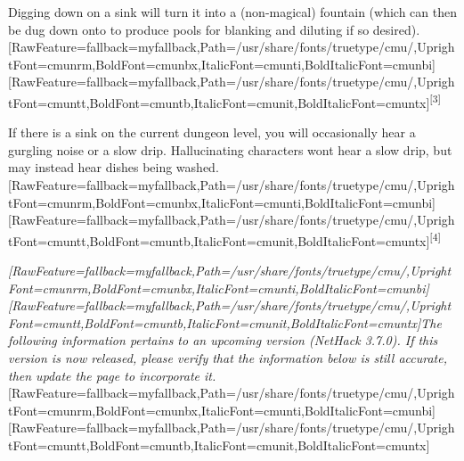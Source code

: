 \begin{myitemize}\item{}Digging\footnotemark[39] down on a sink will turn it into a (non-{}magical) fountain\footnotemark[40] (which can then be dug down onto to produce pools\footnotemark[41] for blanking and diluting\footnotemark[42] if so desired).\allowbreak{}\setmainfont{cmunrm.ttf}[RawFeature={fallback=myfallback},Path=/usr/share/fonts/truetype/cmu/,UprightFont=cmunrm,BoldFont=cmunbx,ItalicFont=cmunti,BoldItalicFont=cmunbi]\setmonofont{cmunrm.ttf}[RawFeature={fallback=myfallback},Path=/usr/share/fonts/truetype/cmu/,UprightFont=cmuntt,BoldFont=cmuntb,ItalicFont=cmunit,BoldItalicFont=cmuntx]\textsuperscript{{$\text{[}$}3{$\text{]}$}}
\end{myitemize}

If there is a sink on the current dungeon level, you will occasionally hear a gurgling noise or a slow drip\footnotemark[43]. Hallucinating characters won\textquotesingle{}t hear a slow drip, but may instead hear dishes being washed.\allowbreak{}\setmainfont{cmunrm.ttf}[RawFeature={fallback=myfallback},Path=/usr/share/fonts/truetype/cmu/,UprightFont=cmunrm,BoldFont=cmunbx,ItalicFont=cmunti,BoldItalicFont=cmunbi]\setmonofont{cmunrm.ttf}[RawFeature={fallback=myfallback},Path=/usr/share/fonts/truetype/cmu/,UprightFont=cmuntt,BoldFont=cmuntb,ItalicFont=cmunit,BoldItalicFont=cmuntx]\textsuperscript{{$\text{[}$}4{$\text{]}$}}




{\itshape \allowbreak{}\setmainfont{cmunti.ttf}[RawFeature={fallback=myfallback},Path=/usr/share/fonts/truetype/cmu/,UprightFont=cmunrm,BoldFont=cmunbx,ItalicFont=cmunti,BoldItalicFont=cmunbi]\setmonofont{cmunti.ttf}[RawFeature={fallback=myfallback},Path=/usr/share/fonts/truetype/cmu/,UprightFont=cmuntt,BoldFont=cmuntb,ItalicFont=cmunit,BoldItalicFont=cmuntx]\itshape The following information pertains to an upcoming version (NetHack 3.7.0\footnotemark[44]). If this version is now released, please verify that the information below is still accurate, then update the page to incorporate it.}\allowbreak{}\setmainfont{cmunrm.ttf}[RawFeature={fallback=myfallback},Path=/usr/share/fonts/truetype/cmu/,UprightFont=cmunrm,BoldFont=cmunbx,ItalicFont=cmunti,BoldItalicFont=cmunbi]\setmonofont{cmunrm.ttf}[RawFeature={fallback=myfallback},Path=/usr/share/fonts/truetype/cmu/,UprightFont=cmuntt,BoldFont=cmuntb,ItalicFont=cmunit,BoldItalicFont=cmuntx]



